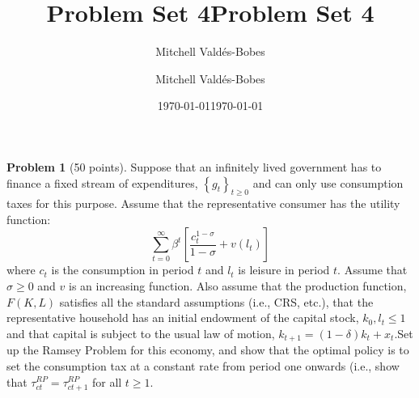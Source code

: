 \documentclass[12pt]{article}
\title{Problem Set 4}
\author{Mitchell Valdés-Bobes}
\date{\today}
\title{Problem Set 4}
\author{Mitchell Valdés-Bobes}
\date{\today}
\theoremstyle{definition}
\newtheorem{problem}{Problem}
\begin{document}
\maketitle

\begin{problem}[50 points] Suppose that an infinitely lived government has to finance a fixed stream of expenditures, $\left\{{g}_{{t}}\right\}_{{t} \geqslant 0}$ and can only use consumption taxes for this purpose. Assume that the representative consumer has the utility function:
$$
\sum_{t=0}^{\infty} \beta^{t}\left[\frac{c_{t}^{1-\sigma}}{1-\sigma}+v\left(l_{t}\right)\right]
$$
where $c_{t}$ is the consumption in period $t$ and $l_{t}$ is leisure in period $t$. Assume that $\sigma \geqslant 0$ and $v$ is an increasing function. Also assume that the production function, $F(K, L)$ satisfies all the standard assumptions (i.e., CRS, etc.), that the representative household has an initial endowment of the capital stock, $k_{0}, l_{t} \leqslant 1$ and that capital is subject to the usual law of motion, $k_{t+1}=(1-\delta) k_{t}+x_{t}$.Set up the Ramsey Problem for this economy, and show that the optimal policy is to set the consumption tax at a constant rate from period one onwards (i.e., show that $\tau_{{ct}}^{{RP}}=\tau_{{ct}+1}^{{RP}}$ for all ${t} \geqslant 1$.
\end{problem}
\end{document}

